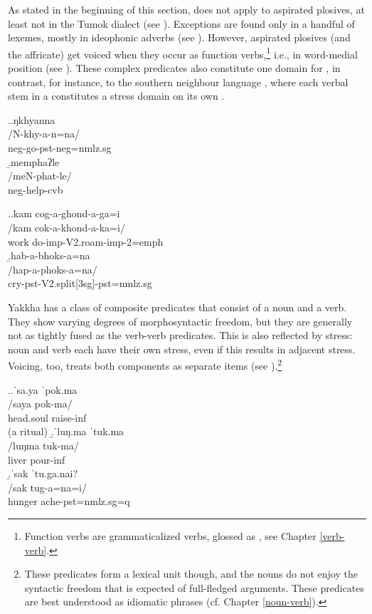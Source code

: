 As stated in the beginning of this section,  does not apply to aspirated plosives, at least not in the Tumok dialect (see \Next). Exceptions are found only in a handful of lexemes, mostly in ideophonic adverbs (see ). However, aspirated plosives (and the affricate) get voiced when they occur as function verbs,\footnote{Function verbs are grammaticalized verbs, glossed as , see Chapter \ref{verb-verb}. } i.e., in word-medial position (see \NNext). These complex predicates also constitute one domain for , in contrast, for instance, to the southern neighbour language , where each verbal stem in a  constitutes a stress domain on its own \citep[57]{Bickeletal2007Free}. 

\ex.\a.\glll ŋkhyanna\\
/N-khy-a-n=na/\\
{\sc neg-}go{\sc [3sg]-pst-neg=nmlz.sg}\\
\b.\glll memphaʔle\\
/meN-phat-le/\\
{\sc neg-}help{\sc -cvb}\\


\ex.\a.\glll kam cog-a-ghond-a-ga=i\\
/kam cok-a-khond-a-ka=i/\\
work do{\sc -imp-V2.roam-imp-2=emph}\\
\b.\glll hab-a-bhoks-a=na\\
/hap-a-phoks-a=na/\\
cry{\sc -pst-V2.split[3sg]-pst=nmlz.sg}\\

 

Yakkha has a class of composite predicates that consist of a noun and a verb. They show varying degrees of morphosyntactic freedom, but they are generally not as tightly fused as the  verb-verb predicates. This is also reflected by stress: noun and verb each have their own stress, even if this results in adjacent stress. Voicing, too, treats both components as separate items  (see \Next).\footnote{These predicates form a lexical unit though, and the nouns do not enjoy the syntactic freedom that is expected of full-fledged arguments. These predicates are best understood as idiomatic phrases (cf. Chapter \ref{noun-verb}).}

\ex.\a.\glll ˈsa.ya  ˈpok.ma\\
/saya pok-ma/\\
head.soul raise{\sc -inf}\\
 (a ritual)
\b.\glll  ˈluŋ.ma ˈtuk.ma\\
/luŋma tuk-ma/\\
liver pour{\sc -inf}\\
\b.\glll  ˈsak ˈtu.ga.nai?\\
/sak tug-a=na=i/\\
hunger ache{\sc [3sg]-pst=nmlz.sg=q}\\


